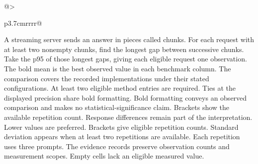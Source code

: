 \documentclass[conference,onecolumn]{IEEEtran}
\begin{document}
\begin{table}[!htp]
\begin{tabular}{@{}>{\raggedright\arraybackslash}p{3.7cm}rrrr@{}}
\bottomrule
\end{tabular}\par\medskip
\begin{minipage}{\linewidth}\footnotesize
A streaming server sends an answer in pieces called chunks. For each request with at least two nonempty chunks, find the longest gap between successive chunks. Take the p95 of those longest gaps, giving each eligible request one observation.
The bold mean is the best observed value in each benchmark column. The comparison covers the recorded implementations under their stated configurations. At least two eligible method entries are required. Ties at the displayed precision share bold formatting. Bold formatting conveys an observed comparison and makes no statistical-significance claim. Brackets show the available repetition count. Response differences remain part of the interpretation. Lower values are preferred.
Brackets give eligible repetition counts. Standard deviation appears when at least two repetitions are available. Each repetition uses three prompts. The evidence records preserve observation counts and measurement scopes. Empty cells lack an eligible measured value.
\end{minipage}
\end{table}
\end{document}

